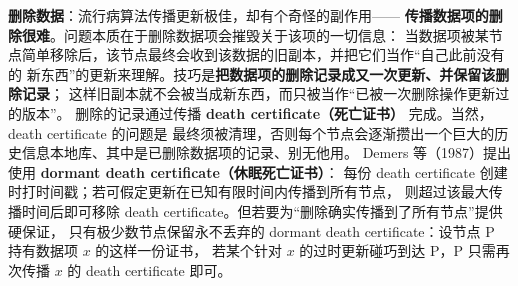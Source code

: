 \medskip\noindent\textbf{删除数据}：流行病算法传播更新极佳，却有个奇怪的副作用——
\textbf{传播数据项的删除很难}。问题本质在于删除数据项会摧毁关于该项的一切信息：
当数据项被某节点简单移除后，该节点最终会收到该数据的旧副本，并把它们当作“自己此前没有的
新东西”的更新来理解。技巧是\textbf{把数据项的删除记录成又一次更新、并保留该删除记录}；
这样旧副本就不会被当成新东西，而只被当作“已被一次删除操作更新过的版本”。
删除的记录通过传播 \textbf{death certificate（死亡证书）} 完成。当然，death certificate 的问题是
最终须被清理，否则每个节点会逐渐攒出一个巨大的历史信息本地库、其中是已删除数据项的记录、别无他用。
Demers 等（1987）提出使用 \textbf{dormant death certificate（休眠死亡证书）}：
每份 death certificate 创建时打时间戳；若可假定更新在已知有限时间内传播到所有节点，
则超过该最大传播时间后即可移除 death certificate。但若要为“删除确实传播到了所有节点”提供硬保证，
只有极少数节点保留永不丢弃的 dormant death certificate：设节点 P 持有数据项 $x$ 的这样一份证书，
若某个针对 $x$ 的过时更新碰巧到达 P，P 只需再次传播 $x$ 的 death certificate 即可。

\begin{closeread}
\end{closeread}



